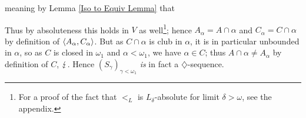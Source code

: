 {meaning by Lemma \ref{Iso to Equiv Lemma} that

Thus by absoluteness this holds in $V$ as well\footnote{For a proof of the fact that $<_L$ is $L_\delta$-absolute for limit $\delta>\omega$, see the appendix.}; hence $A_\alpha=A\cap\alpha$ and $C_\alpha=C\cap\alpha$ by definition of $\langle A_\alpha,C_\alpha\rangle$. But as $C\cap\alpha$ is club in $\alpha$, it is in particular unbounded in $\alpha$, so as $C$ is closed in $\omega_1$ and $\alpha<\omega_1$, we have $\alpha\in C$; thus $A\cap\alpha\neq A_\alpha$ by definition of $C$, $\operatorname{\lightning}$. Hence $(S_\gamma)_{\gamma<\omega_1}$ \textit{is} in fact a $\diamondsuit$-sequence.
}

